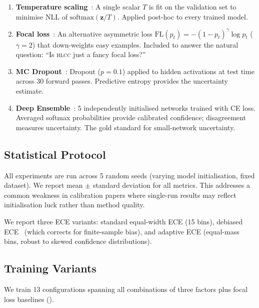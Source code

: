 \documentclass[11pt,a4paper]{article}
\newcommand{\hlcc}{\textsc{hlcc}}
\begin{document}
\begin{enumerate}
  \item \textbf{Temperature scaling}~\cite{guo2017calibration}: A
        single scalar $T$ is fit on the validation set to minimise
        NLL of $\text{softmax}(\mathbf{z}/T)$.  Applied post-hoc to
        every trained model.
  \item \textbf{Focal loss}~\cite{lin2017focal}: An alternative
        asymmetric loss $\text{FL}(p_t) = -(1-p_t)^\gamma \log p_t$
        ($\gamma = 2$) that down-weights easy examples.  Included to
        answer the natural question: ``Is \hlcc{} just a fancy focal
        loss?''
  \item \textbf{MC Dropout}~\cite{gal2016dropout}: Dropout ($p=0.1$)
        applied to hidden activations at test time across 30 forward
        passes.  Predictive entropy provides the uncertainty estimate.
  \item \textbf{Deep Ensemble}~\cite{lakshminarayanan2017simple}: 5
        independently initialised networks trained with CE loss.
        Averaged softmax probabilities provide calibrated confidence;
        disagreement measures uncertainty.  The gold standard for
        small-network uncertainty.
\end{enumerate}

\subsection{Statistical Protocol}
\label{sec:stats}

All experiments are run across 5 random seeds (varying model
initialisation, fixed dataset).  We report mean $\pm$ standard
deviation for all metrics.  This addresses a common weakness in
calibration papers where single-run results may reflect
initialisation luck rather than method quality.

We report three ECE variants: standard equal-width ECE (15 bins),
debiased ECE~\cite{kumar2019verified} (which corrects for finite-sample
bias), and adaptive ECE (equal-mass bins, robust to skewed confidence
distributions).

\subsection{Training Variants}
\label{sec:variants}

We train 13 configurations spanning all combinations of three factors
plus focal loss baselines ().
\end{document}
